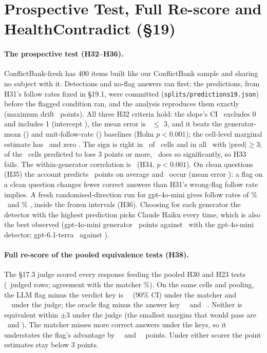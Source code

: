 \section{Prospective Test, Full Re-score and HealthContradict (\S19)}
\label{app:fresh}


\paragraph{The prospective test (H32--H36).} ConflictBank-fresh has 400 items built like our ConflictBank sample and
sharing no subject with it. Detections and no-flag answers ran first; the predictions, from H31's follow rates fixed in
\S19.1, were committed (\texttt{splits/predictions19.json}) before the flagged condition ran, and the analysis
reproduces them exactly (maximum drift \frDrift\ points). All three H32 criteria hold: the slope's CI \frSlopeCI\ excludes 0 and
includes 1 (intercept \frIntercept), the mean error is \frMae\ $\le$ 3, and it beats the generator-mean (\frMaeGen) and
unit-follow-rate (\frMaeOnes) baselines (Holm $p<0.001$); the cell-level marginal estimate has \frMaeMarg\ and zero
\frMaeZero. The sign is right in \frSignAgree\ of \frN\ cells and in all \frBigN\ with $|\text{pred}|\ge3$; of the
\frHarmN\ cells predicted to lose 3 points or more, \frHarmConf\ does so significantly, so H33 fails. The within-generator
correlation is \frRWithin\ (H34, $p<0.001$). On clean questions (H35) the account predicts \frCleanPred\ points on
average and \frCleanObs\ occur (mean error \frCleanMae): a flag on a clean question changes fewer correct answers than
H31's wrong-flag follow rate implies. A fresh randomised-direction run for gpt-4o-mini gives follow rates of
\frFollowR\% \frFollowRCI\ and \frFollowW\% \frFollowWCI, inside the frozen intervals (H36). Choosing for each
generator the detector with the highest prediction picks Claude Haiku every time, which is also the best observed
(gpt-4o-mini generator \frSelMiniObs\ points against \frMiniDetMiniObs\ with the gpt-4o-mini detector; gpt-6.1-terra
\frSelTerraObs\ against \frMiniDetTerraObs).

\paragraph{Full re-score of the pooled equivalence tests (H38).} The \S17.3 judge scored every response feeding the
pooled H30 and H23 tests (\jdN\ judged rows; agreement with the matcher \jdAgree\%). On the same cells and pooling,
the LLM flag minus the verdict key is \jdThirtyM\ \jdThirtyMNinetyCI\ (90\% CI) under the matcher and \jdThirtyJ\
\jdThirtyJNinetyCI\ under the judge; the oracle flag minus the answer key \jdTwentyThreeM\ \jdTwentyThreeMNinetyCI\
and \jdTwentyThreeJ\ \jdTwentyThreeJNinetyCI. Neither is equivalent within $\pm$3 under the judge (the smallest margins
that would pass are \jdThirtyJMargin\ and \jdTwentyThreeJMargin). The matcher misses more correct answers under the keys,
so it understates the flag's advantage by \ajdThirtyShift\ \jdThirtyShiftCI\ and \ajdTwentyThreeShift\
\jdTwentyThreeShiftCI\ points. Under either scorer the point estimates stay below 3 points.


